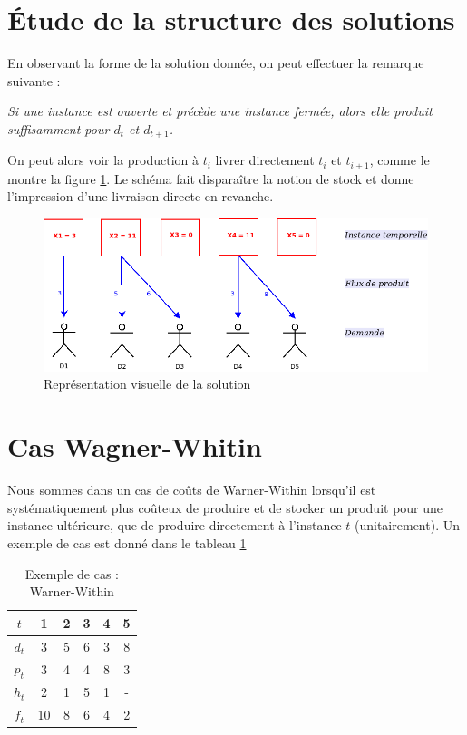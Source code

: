 \documentclass[a4paper,11pt,twoside]{report}
\begin{document}
\newpage
\section{Étude de la structure des solutions}
En observant la forme de la solution donnée, on peut effectuer la remarque suivante :



\textit{Si une instance est ouverte et précède une instance fermée, alors elle produit suffisamment pour $d_t$ et $d_{t+1}$.}




On peut alors voir la production à $t_i$ livrer directement $t_i$ et $t_{i+1}$, comme le montre la figure \ref{representation_graphique}. Le schéma fait disparaître la notion de stock et donne l'impression d'une livraison directe en revanche.


\begin{figure}[h]
 \centering
 \includegraphics[width=\textwidth]{Diagramme1.png}
 \caption{Représentation visuelle de la solution}
 \label{representation_graphique}
\end{figure}
\section{Cas Wagner-Whitin}
Nous sommes dans un cas de coûts de Warner-Within lorsqu'il est systématiquement plus coûteux de produire et de stocker un produit pour une instance ultérieure, que de produire directement à l'instance $t$ (unitairement).
Un exemple de cas est donné dans le tableau \ref{warner1}
\begin{table}[h]
  \centering
 \begin{tabular}{|c|ccccc|}
\hline
$t$&1&2&3&4&5\\\hline\hline
$d_t$&3&5&6&3&8\\
$p_t$&3&4&4&8&3\\
$h_t$&2&1&5&1&-\\
$f_t$&10&8&6&4&2\\\hline
\end{tabular}
 \caption{Exemple de cas : Warner-Within}
 \label{warner1}
\end{table}
\end{document}
